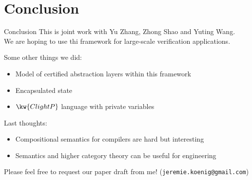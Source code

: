 \documentclass[aspectratio=1610,12pt]{beamer}
\begin{document}
\section{Conclusion}

\begin{frame}{Conclusion}
This is joint work with
Yu Zhang, Zhong Shao and Yuting Wang. \\
We are hoping to use thi framework
for large-scale verification applications.

Some other things we did:
\begin{itemize}
  \item Model of certified abstraction layers within this framework
  \item Encapsulated state
  \item $\kw{ClightP}$ language with private variables
\end{itemize}

\vfill\pause
Last thoughts:
\begin{itemize}
  \item Compositional semantics for compilers are hard but interesting
  \item Semantics and higher category theory can be useful for engineering
\end{itemize}

Please feel free to request our paper draft from me!
(\texttt{jeremie.koenig@gmail.com})
\end{frame}
\end{document}
